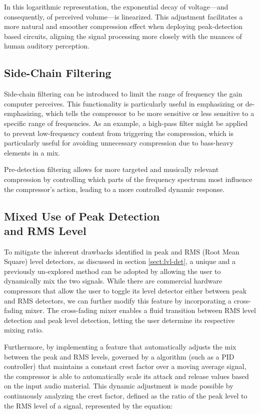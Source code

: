 \documentclass[10pt]{article}
\begin{document}
\begin{multicols*}{2}
                \noindent In this logarithmic representation, the exponential decay of voltage—and consequently, of perceived volume—is linearized. This adjustment facilitates a more natural and smoother compression effect when deploying peak-detection based circuits, aligning the signal processing more closely with the nuances of human auditory perception. 
                
            \subsection{Side-Chain Filtering}
                Side-chain filtering can be introduced to limit the range of frequency the gain computer perceives. This functionality is particularly useful in emphasizing or de-emphasizing, which tells the compressor to be more sensitive or less sensitive to a specific range of frequencies.
                As an example, a high-pass filter might be applied to prevent low-frequency content from triggering the compression, which is particularly useful for avoiding unnecessary compression due to bass-heavy elements in a mix. \cite{side-chain-filtering}\par
                Pre-detection filtering allows for more targeted and musically relevant compression by controlling which parts of the frequency spectrum most influence the compressor's action, leading to a more controlled dynamic response.
                
            \subsection[Mixed Use of Peak Detection and RMS Level]{Mixed Use of Peak Detection\\and RMS Level} \label{sect:rms-peak-mix}
                To mitigate the inherent drawbacks identified in peak and RMS (Root Mean Square) level detectors, as discussed in section \ref{sect:lvl-det}, a unique and a previously un-explored method can be adopted by allowing the user to dynamically mix the two signals. While there are commercial hardware compressors that allow the user to toggle its level detector either between peak and RMS detectors, we can further modify this feature by incorporating a cross-fading mixer. The cross-fading mixer enables a fluid transition between RMS level detection and peak level detection, letting the user determine its respective mixing ratio.\par
                Furthermore, by implementing a feature that automatically adjusts the mix between the peak and RMS levels, governed by a algorithm (such as a PID controller) that maintains a constant crest factor over a moving average signal, the compressor is able to automatically scale its attack and release values based on the input audio material. This dynamic adjustment is made possible by continuously analyzing the crest factor, defined as the ratio of the peak level to the RMS level of a signal, represented by the equation:


\end{multicols*}
\end{document}
